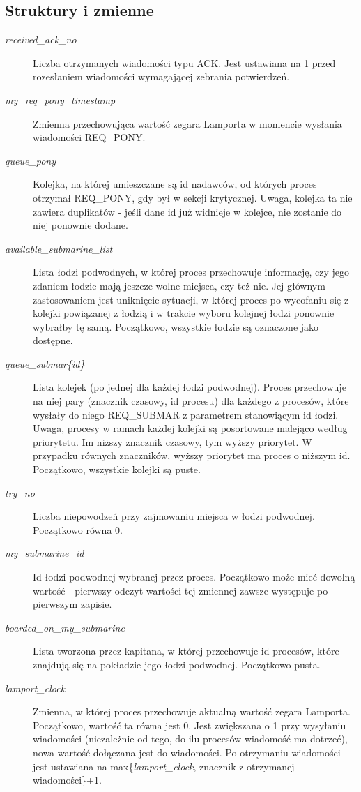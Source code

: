 \documentclass[a4paper]{article}
\begin{document}
\subsection{Struktury i zmienne}
\begin{description}
    \item [\textit{received\_ack\_no}] Liczba otrzymanych wiadomości typu ACK. Jest ustawiana na 1 przed rozesłaniem wiadomości wymagającej zebrania potwierdzeń.
    \item [\textit{my\_req\_pony\_timestamp}] Zmienna przechowująca wartość zegara Lamporta w momencie wysłania wiadomości REQ\_PONY.
    \item [\textit{queue\_pony}] Kolejka, na której umieszczane są id nadawców, od których proces otrzymał REQ\_PONY, gdy był w sekcji krytycznej. Uwaga, kolejka ta nie zawiera duplikatów - jeśli dane id już widnieje w kolejce, nie zostanie do niej ponownie dodane.
    \item [\textit{available\_submarine\_list}] Lista łodzi podwodnych, w której proces przechowuje informację, czy jego zdaniem łodzie mają jeszcze wolne miejsca, czy też nie. Jej głównym zastosowaniem jest uniknięcie sytuacji, w której proces po wycofaniu się z kolejki powiązanej z łodzią i w trakcie wyboru kolejnej łodzi ponownie wybrałby tę samą. Początkowo, wszystkie łodzie są oznaczone jako dostępne.
    \item [\textit{queue\_submar\{id\}}] Lista kolejek (po jednej dla każdej łodzi podwodnej). Proces przechowuje na niej pary (znacznik czasowy, id procesu) dla każdego z procesów, które wysłały do niego REQ\_SUBMAR z parametrem stanowiącym id łodzi. Uwaga, procesy w ramach każdej kolejki są posortowane malejąco według priorytetu. Im niższy znacznik czasowy, tym wyższy priorytet. W przypadku równych znaczników, wyższy priorytet ma proces o niższym id. Początkowo, wszystkie kolejki są puste.
    \item [\textit{try\_no}] Liczba niepowodzeń przy zajmowaniu miejsca w łodzi podwodnej. Początkowo równa 0.
    \item [\textit{my\_submarine\_id}] Id łodzi podwodnej wybranej przez proces. Początkowo może mieć dowolną wartość - pierwszy odczyt wartości tej zmiennej zawsze występuje po pierwszym zapisie.
    \item [\textit{boarded\_on\_my\_submarine}] Lista tworzona przez kapitana, w której przechowuje id procesów, które znajdują się na pokładzie jego łodzi podwodnej. Początkowo pusta.
    \item [\textit{lamport\_clock}] Zmienna, w której proces przechowuje aktualną wartość zegara Lamporta. Początkowo, wartość ta równa jest 0. Jest zwiększana o 1 przy wysyłaniu wiadomości (niezależnie od tego, do ilu procesów wiadomość ma dotrzeć), nowa wartość dołączana jest do wiadomości. Po otrzymaniu wiadomości jest ustawiana na max\{\textit{lamport\_clock}, znacznik z otrzymanej wiadomości\}+1.

\end{description}
\end{document}
